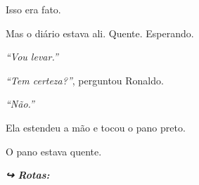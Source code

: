 \noindent Isso era fato.

\noindent Mas o diário estava ali. Quente. Esperando.

\noindent \textit{\textquotedblleft{}Vou levar.\textquotedblright{}}

\noindent \textit{\textquotedblleft{}Tem certeza?\textquotedblright{}}, perguntou Ronaldo.

\noindent \textit{\textquotedblleft{}Não.\textquotedblright{}}

\noindent Ela estendeu a mão e tocou o pano preto.

\noindent O pano estava quente.

\vspace{0.5em}
\noindent\textit{\textbf{↪ Rotas:}  \rotasep {} \rotasep {}}